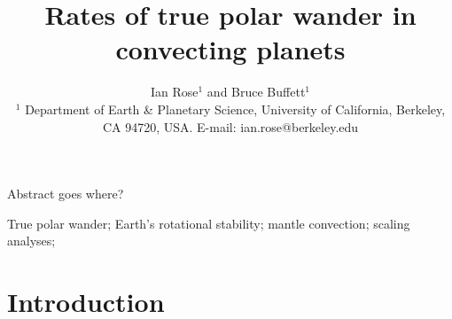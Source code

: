 \documentclass{gji}
\title[TPW Rates]
  {Rates of true polar wander in convecting planets}
\author[I. Rose and B. Buffett]
  {Ian Rose$^1$ and Bruce Buffett$^1$ \\
  $^1$ Department of Earth \& Planetary Science, University of California, Berkeley, CA 94720, USA.  E-mail: ian.rose@berkeley.edu
  }
\date{}
\begin{document}
\label{firstpage}

\maketitle

\begin{summary}
Abstract goes where?
\end{summary}

\begin{keywords}
True polar wander; Earth's rotational stability; mantle convection; scaling analyses;
\end{keywords}

\section{Introduction}


\begin{acknowledgments}
\end{acknowledgments}




\label{lastpage}
\end{document}

